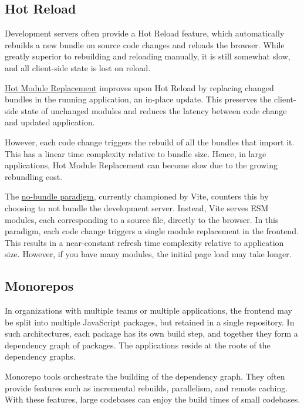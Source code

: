 \documentclass{article}
\begin{document}
\subsection{Hot Reload}

Development servers often provide a Hot Reload feature, which automatically rebuilds a new bundle on
source code changes and reloads the browser. While greatly superior to rebuilding and reloading
manually, it is still somewhat slow, and all client-side state is lost on reload.

\href{https://webpack.js.org/concepts/hot-module-replacement/}{Hot Module Replacement} improves upon
Hot Reload by replacing changed bundles in the running application, an in-place update. This
preserves the client-side state of unchanged modules and reduces the latency between code change and
updated application.

However, each code change triggers the rebuild of all the bundles that import it. This has a linear
time complexity relative to bundle size. Hence, in large applications, Hot Module Replacement can
become slow due to the growing rebundling cost.

The \href{https://vitejs.dev/guide/why.html}{no-bundle paradigm}, currently championed by Vite,
counters this by choosing to not bundle the development server. Instead, Vite serves ESM modules,
each corresponding to a source file, directly to the browser. In this paradigm, each code change
triggers a single module replacement in the frontend. This results in a near-constant refresh time
complexity relative to application size. However, if you have many modules, the initial page load
may take longer.

\subsection{Monorepos}

In organizations with multiple teams or multiple applications, the frontend may be split into
multiple JavaScript packages, but retained in a single repository. In such architectures, each
package has its own build step, and together they form a dependency graph of packages. The
applications reside at the roots of the dependency graphs.

Monorepo tools orchestrate the building of the dependency graph. They often provide features such as
incremental rebuilds, parallelism, and remote caching. With these features, large codebases can
enjoy the build times of small codebases.
\end{document}
